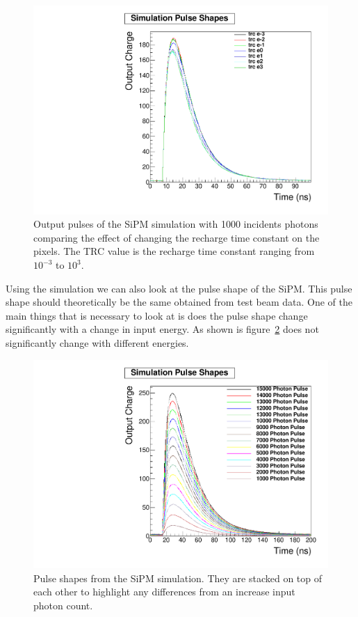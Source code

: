 \begin{figure}
\centering
\includegraphics[width=0.8\linewidth]{Figures/trc.pdf}
\caption{Output pulses of the SiPM simulation with 1000 incidents photons comparing the effect of changing the recharge time constant on the pixels. The TRC value is the recharge time constant ranging from $10^{-3}$ to $10^3$.}
\label{fig:trc}
\end{figure}

Using the simulation we can also look at the pulse shape of the SiPM. This pulse shape should theoretically be the same obtained from test beam data. One of the main things that is necessary to look at is does the pulse shape change significantly with a change in input energy. As shown is figure~\ref{fig:SimPul} does not significantly change with different energies.

\begin{figure}
\centering
\includegraphics[width=0.8\linewidth]{Figures/SimPul.pdf}
\caption{Pulse shapes from the SiPM simulation. They are stacked on top of each other to highlight any differences from an increase input photon count.}
\label{fig:SimPul}
\end{figure}

